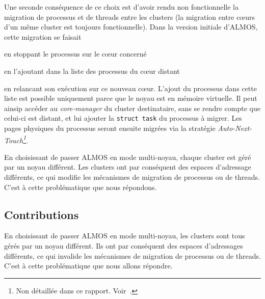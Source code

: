     Une seconde conséquence de ce choix est d'avoir rendu non fonctionnelle la
    migration de processus et de threads entre les clusters (la migration entre
    c\oe urs d'un même cluster est toujours fonctionnelle). Dans la version
    initiale d'ALMOS, cette migration se faisait\benumline \item en stoppant le
    processus sur le c\oe ur concerné \item en l'ajoutant dans la liste des
    processus du c\oe ur distant \item en relancant son exécution sur ce nouveau
    c\oe ur\eenumline. L'ajout du processus dans cette liste est possible
    uniquement parce que le noyau est en mémoire virtuelle. Il peut ainsip
    accéder au \textit{core-manager} du cluster destinataire, sans se rendre
    compte que celui-ci est distant, et lui ajouter la \texttt{struct task} du
    processus à migrer. Les pages physiques du processus seront ensuite migrées
    via la stratégie \textit{Auto-Next-Touch\footnote{Non détaillée dans ce
        rapport. Voir~\citep{almaless2014universite}.}}.

    En choisissant de passer ALMOS en mode multi-noyau, chaque cluster est géré
    par un noyau différent. Les clusters ont par conséquent des espaces
    d'adressage différents, ce qui modifie les mécanismes de migration de
    processus ou de threads. C'est à cette problématique que nous répondons.


    \subsection{Contributions}

      En choisissant de passer ALMOS en mode multi-noyau, les clusters sont tous
      gérés par un noyau différent. Ils ont par conséquent des espaces
      d'adressages différents, ce qui invalide les mécanismes de migration de
      processus ou de threads. C'est à cette problématique que nous allons
      répondre.
